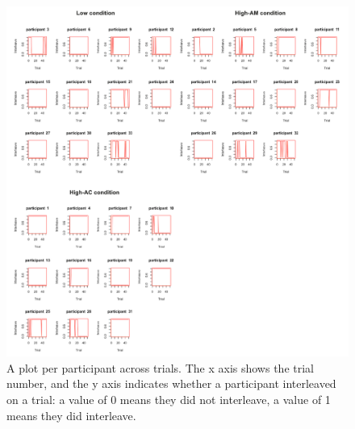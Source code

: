 \begin{figure}[!htbp]
\includegraphics[width=\textwidth,keepaspectratio]{images/ch34/ch34_individualInterleaving.pdf}
    \caption[Study 4 interleaving rates per participant]{A plot per participant across trials. The x axis shows the trial number, and the y axis indicates whether a participant interleaved on a trial: a value of 0 means they did not interleave, a value of 1 means they did interleave.}\label{fig:ch34_4-plotpp}
\end{figure}

